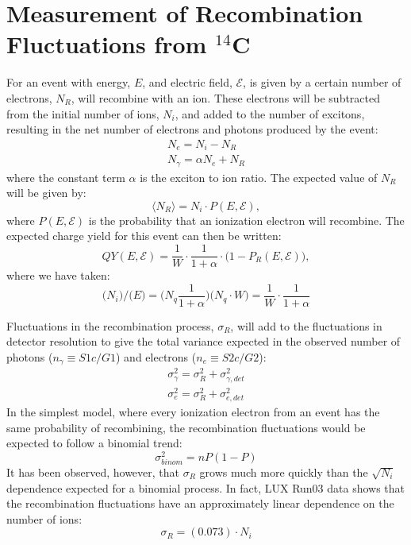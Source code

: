 \section{Measurement of Recombination Fluctuations from $^{14}$C}\label{sec:sigr}
For an event with energy, $E$, and electric field, $\mathcal{E}$, is given by a certain number of electrons, $N_R$, will recombine with an ion. These electrons will be subtracted from the initial number of ions, $N_{i}$, and added to the number of excitons, resulting in the net number of electrons and photons produced by the event:
\begin{equation} 
\begin{split}
N_e=N_i-N_R \\
N_{\gamma}=\alpha N_e+N_R
\end{split}
\end{equation}
where the constant term $\alpha$  is the exciton to ion ratio. The expected value of $N_R$ will be given by:
\begin{equation}
\langle N_R \rangle = N_i\cdot P(E,\mathcal{E}),
\end{equation}
where $P(E,\mathcal{E})$ is the probability that an ionization electron will recombine. The expected charge yield for this event can then be written:
\begin{equation}
QY(E,\mathcal{E})=\frac{1}{W} \cdot \frac{1}{1+\alpha} \cdot \bigg(1-P_R(E,\mathcal{E})\bigg),
\end{equation}
where we have taken:
\begin{equation}
\Big(N_i\Big)/\Big(E\Big)=\Big( N_q\frac{1}{1+\alpha} \Big)\Big(N_q\cdot W\Big)= \frac{1}{W} \cdot \frac{1}{1+\alpha}
\end{equation}

Fluctuations in the recombination process, $\sigma_R$, will add to the fluctuations in detector resolution to give the total variance expected in the observed number of photons ($n_{\gamma}\equiv S1c/G1$) and electrons ($n_{e}\equiv S2c/G2$):
\begin{equation}\label{eq:detres_rec}
\begin{split}
\sigma_{\gamma}^2=\sigma_{R}^2+\sigma_{\gamma,det}^2\\[1em]
\sigma_{e}^2=\sigma_{R}^2+\sigma_{e,det}^2
\end{split}
\end{equation}
In the simplest model, where every ionization electron from an event has the same probability of recombining, the recombination fluctuations would be expected to follow a binomial trend:
\begin{equation}
\sigma_{binom}^2=nP(1-P)
\end{equation}
It has been observed, however, that $\sigma_R$ grows much more quickly than the $\sqrt{N_i}$ dependence expected for a binomial process. In fact, LUX Run03 data shows that the recombination fluctuations have an approximately linear dependence on the number of ions\cite{lux_tritium}:
\begin{equation}
\sigma_R=(0.073)\cdot N_i
\end{equation}



